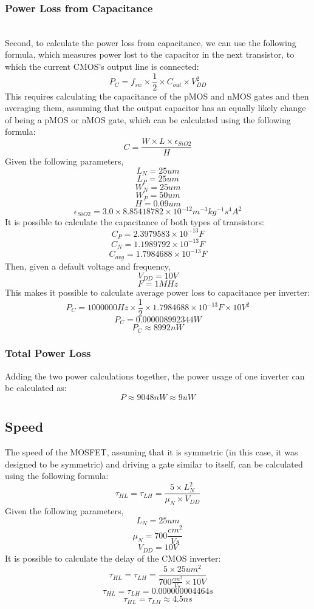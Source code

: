 \documentclass[12pt]{article}
\begin{document}
\subsubsection{Power Loss from Capacitance}
\\Second, to calculate the power loss from capacitance, we can use the following formula, which measures power lost to the capacitor in the next transistor, to which the current CMOS's output line is connected:
\[P_C = f_{sw} \times \frac{1}{2} \times C_{out} \times V_{DD}^2 \]
This requires calculating the capacitance of the pMOS and nMOS gates and then averaging them, assuming that the output capacitor has an equally likely change of being a pMOS or nMOS gate, which can be calculated using the following formula:
\[C = \frac{W \times L \times \epsilon _{SiO2}}{H} \]
Given the following parameters,
\[L_N = 25um \]
\[L_P = 25um \]
\[W_N = 25um \]
\[W_P = 50um \]
\[H = 0.09um \]
\[\epsilon _{SiO2} = 3.0 \times 8.85418782 \times 10^{-12} m^{-3} kg^{-1} s^4 A^2\]
It is possible to calculate the capacitance of both types of transistors:
\[C_P = 2.3979583\times10^{-13}F\]
\[C_N = 1.1989792\times10^{-13}F\]
\[C_{avg} = 1.7984688\times10^{-13}F\]
Then, given a default voltage and frequency,
\[V_{DD} = 10V \]
\[F = 1MHz \]
This makes it possible to calculate average power loss to capacitance per inverter:
\[P_C = 1000000Hz \times \frac{1}{2} \times 1.7984688\times10^{-13}F \times 10V^2 \]
\[P_C = 0.000008992344W \]
\[P_C \approx 8992nW \]

\subsubsection{Total Power Loss}
Adding the two power calculations together, the power usage of one inverter can be calculated as:
\[P \approx 9048nW \approx 9uW \]


\subsection{Speed}
The speed of the MOSFET, assuming that it is symmetric (in this case, it was designed to be symmetric) and driving a gate similar to itself, can be calculated using the following formula:
\[\tau _{HL} = \tau _{LH} = \frac{5 \times L_N^2}{\mu _N \times V_{DD}} \]
Given the following parameters,
\[L_N = 25um \]
\[\mu _N = 700\frac{cm^2}{Vs} \]
\[V_{DD} = 10V \]
It is possible to calculate the delay of the CMOS inverter:
\[\tau _{HL} = \tau _{LH} = \frac{5 \times 25um^2}{700\frac{cm^2}{Vs} \times 10V} \]
\[\tau _{HL} = \tau _{LH} = 0.000000004464s \]
\[\tau _{HL} = \tau _{LH} \approx 4.5ns \]
\end{document}
